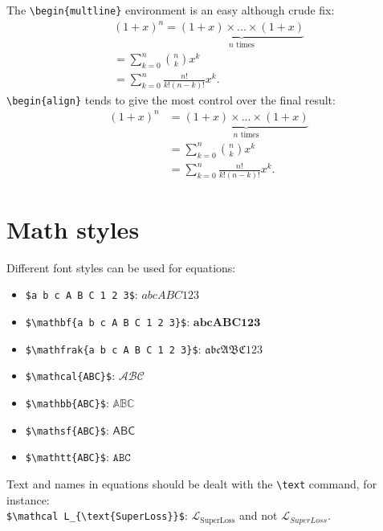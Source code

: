         The \verb|\begin{multline}| environment is an easy although crude fix:
        \begin{multline}
                (1+x)^n = \underbrace{(1+x)\times...\times(1+x)}_{n \text{ times}} \\
                = \sum_{k=0}^n \binom{n}{k}x^k \\
                = \sum_{k=0}^n\frac{n!}{k!(n-k)!}x^k .
        \end{multline}
        \verb|\begin{align}| tends to give the most control over the final result:
        \begin{align}
                (1+x)^n &= \underbrace{(1+x)\times...\times(1+x)}_{n \text{ times}} \nonumber\\
                        &= \sum_{k=0}^n \binom{n}{k}x^k \nonumber\\
                        &= \sum_{k=0}^n\frac{n!}{k!(n-k)!}x^k .
        \end{align}


\section{Math styles}
        Different font styles can be used for equations:
        \begin{itemize}
                \item \verb|$a b c A B C 1 2 3$|: $ a b c A B C 1 2 3 $
                \item \verb|$\mathbf{a b c A B C 1 2 3}$|: $ \mathbf{a b c A B C 1 2 3} $
                \item \verb|$\mathfrak{a b c A B C 1 2 3}$|: $ \mathfrak{a b c A B C 1 2 3} $
                \item \verb|$\mathcal{ABC}$|: $ \mathcal{ABC} $
                \item \verb|$\mathbb{ABC}$|: $ \mathbb{ABC} $
                \item \verb|$\mathsf{ABC}$|: $ \mathsf{ABC} $
                \item \verb|$\mathtt{ABC}$|: $ \mathtt{ABC} $
        \end{itemize}

        Text and names in equations should be dealt with the \verb|\text| command, for instance:\\
        \verb|$\mathcal L_{\text{SuperLoss}}$|: $\mathcal L_{\text{SuperLoss}}$ and not $\mathcal L_{SuperLoss}$.